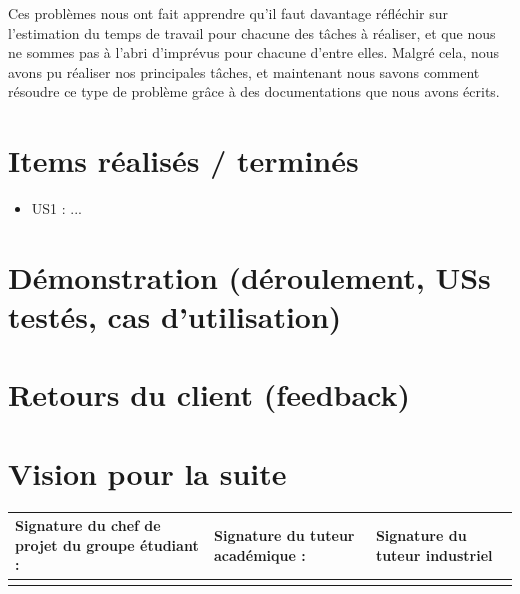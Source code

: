 \documentclass[12pt,titlepage,french]{article}
\begin{document}
Ces problèmes nous ont fait apprendre qu'il faut davantage réfléchir sur l'estimation du temps de travail pour chacune des tâches à réaliser, et que nous ne sommes pas à l'abri d'imprévus pour chacune d'entre elles. Malgré cela, nous avons pu réaliser nos principales tâches, et maintenant nous savons comment résoudre ce type de problème grâce à des documentations que nous avons écrits.

\section{Items réalisés / terminés}

\begin{itemize}
  \item US1 : ...
\end{itemize}

\section{Démonstration (déroulement, USs testés, cas d'utilisation)}

\section{Retours du client (feedback)}

\section{Vision pour la suite}


\noindent\begin{tabularx}{\textwidth}{|X|X|X|}
    \hline
    \textbf{Signature du chef de projet du groupe étudiant :} & \textbf{Signature du tuteur académique :} & \textbf{Signature du tuteur industriel}\\
    \hline
   \rule{0pt}{3cm} &
    &\\
    \hline
\end{tabularx}
\end{document}
